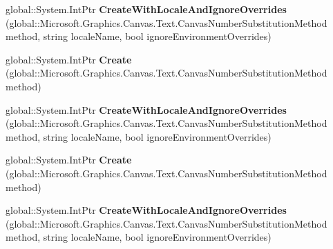 \begin{DoxyCompactItemize}
global\+::\+System.\+Int\+Ptr {\bfseries Create\+With\+Locale\+And\+Ignore\+Overrides} (global\+::\+Microsoft.\+Graphics.\+Canvas.\+Text.\+Canvas\+Number\+Substitution\+Method method, string locale\+Name, bool ignore\+Environment\+Overrides)
\item 
\mbox{\label{interface_microsoft_1_1_graphics_1_1_canvas_1_1_text_1_1_i_canvas_number_substitution_factory_abee228335a4826f4809b5932bdb32ae2}} 
global\+::\+System.\+Int\+Ptr {\bfseries Create} (global\+::\+Microsoft.\+Graphics.\+Canvas.\+Text.\+Canvas\+Number\+Substitution\+Method method)
\item 
\mbox{\label{interface_microsoft_1_1_graphics_1_1_canvas_1_1_text_1_1_i_canvas_number_substitution_factory_a02cc93fd08d82ad029a3ad58cd6c1a9e}} 
global\+::\+System.\+Int\+Ptr {\bfseries Create\+With\+Locale\+And\+Ignore\+Overrides} (global\+::\+Microsoft.\+Graphics.\+Canvas.\+Text.\+Canvas\+Number\+Substitution\+Method method, string locale\+Name, bool ignore\+Environment\+Overrides)
\item 
\mbox{\label{interface_microsoft_1_1_graphics_1_1_canvas_1_1_text_1_1_i_canvas_number_substitution_factory_abee228335a4826f4809b5932bdb32ae2}} 
global\+::\+System.\+Int\+Ptr {\bfseries Create} (global\+::\+Microsoft.\+Graphics.\+Canvas.\+Text.\+Canvas\+Number\+Substitution\+Method method)
\item 
\mbox{\label{interface_microsoft_1_1_graphics_1_1_canvas_1_1_text_1_1_i_canvas_number_substitution_factory_a02cc93fd08d82ad029a3ad58cd6c1a9e}} 
global\+::\+System.\+Int\+Ptr {\bfseries Create\+With\+Locale\+And\+Ignore\+Overrides} (global\+::\+Microsoft.\+Graphics.\+Canvas.\+Text.\+Canvas\+Number\+Substitution\+Method method, string locale\+Name, bool ignore\+Environment\+Overrides)
\item 
\mbox{\label{interface_microsoft_1_1_graphics_1_1_canvas_1_1_text_1_1_i_canvas_number_substitution_factory_abee228335a4826f4809b5932bdb32ae2}} 

\end{DoxyCompactItemize}

